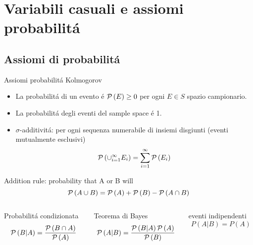 \section{Variabili casuali e assiomi probabilit\'a}

\subsection{Assiomi di probabilit\'a}

\begin{frame}{Assiomi probabilit\'a Kolmogorov}
\begin{itemize}
\item La probabilit\'a di un evento \'e $\operatorname{\mathcal{P}}{(E)}\geq0$ per ogni $E\in S$ spazio campionario.
\item La probabilit\'a degli eventi del sample space \'e 1.
\item $\sigma$-additivit\'a: per ogni sequenza numerabile di insiemi disgiunti (eventi mutualmente esclusivi)
\begin{equation*}
\operatorname{\mathcal{P}}{(\cup_{i=1}^{\infty}E_i)}=\sum_{i=1}^{\infty}\operatorname{\mathcal{P}}{(E_i)}
\end{equation*}
\end{itemize}
\begin{block}{Addition rule: probability that A or B will}
\begin{equation*}
\operatorname{\mathcal{P}}{(A\cup B)}=\operatorname{\mathcal{P}}{(A)}+\operatorname{\mathcal{P}}{(B)}-\operatorname{\mathcal{P}}{(A\cap B)}
\end{equation*}
\end{block}
\begin{columns}[T]
\begin{column}{0.3\textwidth}
\begin{block}{Probabilit\'a condizionata}
\[\operatorname{\mathcal{P}}{(B|A)}=\frac{\operatorname{\mathcal{P}}{(B\cap A)}}{\operatorname{\mathcal{P}}{(A)}}
\]
\end{block}
\end{column}
\begin{column}{0.4\textwidth}
\begin{block}{Teorema di Bayes}
\[\operatorname{\mathcal{P}}{(A|B)}=\frac{\operatorname{\mathcal{P}}{(B|A)}\operatorname{\mathcal{P}}{(A)}}{\operatorname{\mathcal{P}}{(B)}}\]
\end{block}
\end{column}
\begin{column}{0.25\textwidth}
\begin{block}{eventi indipendenti}
    \[P(A|B)=P(A)\]
    \end{block}
    \end{column}
\end{columns}
\end{frame}

